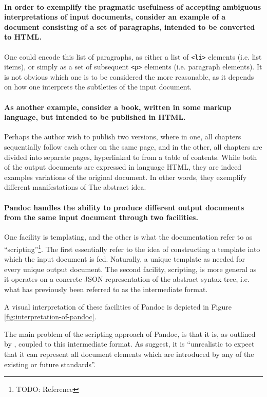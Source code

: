 \documentclass{scrreprt}
\begin{document}
\paragraph{In order to exemplify the pragmatic usefulness of accepting ambiguous interpretations of input documents, consider an example of a document consisting of a set of paragraphs, intended to be converted to HTML.} One could encode this list of paragraphs, as either a list of \texttt{<li>} elements (i.e. list items), or simply as a set of subsequent \texttt{<p>} elements (i.e. paragraph elements). It is not obvious which one is to be considered the more reasonable, as it depends on how one interprets the subtleties of the input document.

\paragraph{As another example, consider a book, written in some markup language, but intended to be published in HTML.} Perhaps the author wish to publish two versions, where in one, all chapters sequentially follow each other on the same page, and in the other, all chapters are divided into separate pages, hyperlinked to from a table of contents. While both of the output documents are expressed in language HTML, they are indeed examples variations of the original document. In other words, they exemplify different manifestations of The abstract idea.




\paragraph{Pandoc handles the ability to produce different output documents from the same input document through two facilities.} One facility is templating, and the other is what the documentation refer to as ``scripting''\footnote{TODO: Reference}. The first essentially refer to the idea of constructing a template into which the input document is fed. Naturally, a unique template as needed for every unique output document. The second facility, scripting, is more general as it operates on a concrete JSON representation of the abstract syntax tree, i.e. what has previously been referred to as the intermediate format.

A visual interpretation of these facilities of Pandoc is depicted in Figure \ref{fig:interpretation-of-pandoc}.

The main problem of the scripting approach of Pandoc, is that it is, as outlined by \citet{krijnen}, coupled to this intermediate format. As \citet{krijnen} suggest, it is ``unrealistic to expect that it can represent all document elements which are introduced by any of the existing or future standards''.
\end{document}

